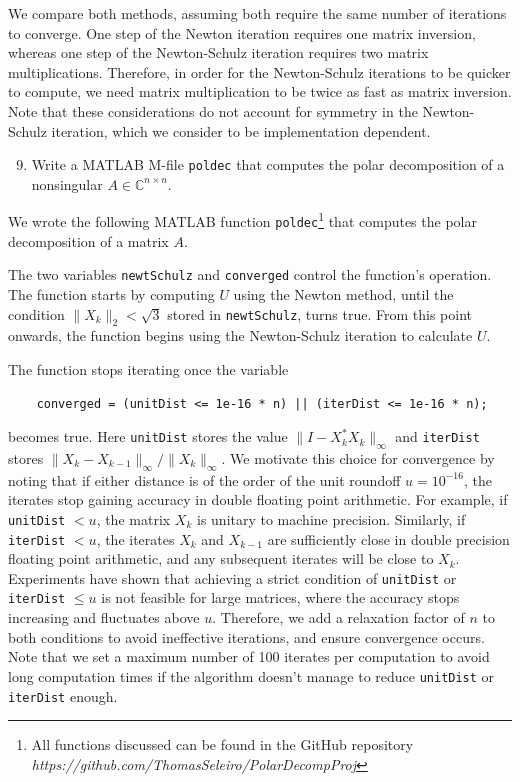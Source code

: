 \documentclass[10pt, A4paper]{article}
\newcommand{\nxn}{n \times n}
\begin{document}
We compare both methods, assuming both require the same number of 
iterations to converge. 
One step of the Newton iteration requires one matrix inversion, whereas 
one step of the Newton-Schulz iteration requires two matrix 
multiplications.
Therefore, in order for the Newton-Schulz iterations to be quicker to 
compute, we need matrix multiplication to be twice as fast as matrix 
inversion.
Note that these considerations do not account for symmetry in the 
Newton-Schulz iteration, which we consider to be implementation 
dependent. 





\vspace{0.2cm}
\begin{enumerate}
	\setcounter{enumi}{8}
	\item Write a MATLAB M-file \texttt{poldec} that computes the 
	polar decomposition of a nonsingular $A \in \mathbb{C}^{\nxn}$.
\end{enumerate}

We wrote the following MATLAB function \texttt{poldec}\footnote{
All functions discussed can be found in the GitHub repository
\emph{https://github.com/ThomasSeleiro/PolarDecompProj}}
that computes the polar decomposition of a matrix $A$.

{\small
{}
}

The two variables \texttt{newtSchulz} and \texttt{converged} control 
the function's operation.
The function starts by computing $U$ using the Newton method, until
the condition $\|X_k\|_2 < \sqrt{3}$ stored in \texttt{newtSchulz},
turns true. 
From this point onwards, the function begins using the {Newton-Schulz} 
iteration to calculate $U$.

The function stops iterating once the variable
\begin{verbatim}
	converged = (unitDist <= 1e-16 * n) || (iterDist <= 1e-16 * n);
\end{verbatim}
becomes true.
Here \texttt{unitDist} stores the value $\|I -X_k^*X_k\|_\infty$ and 
\texttt{iterDist} stores $\|X_k - X_{k-1} \|_\infty / \|X_k\|_\infty$.
We motivate this choice for convergence by noting that if either 
distance is of the order of the unit roundoff $u = 10^{-16}$, the 
iterates stop gaining accuracy in double floating point arithmetic.
For example, if \texttt{unitDist} $< u$, the matrix $X_k$ is unitary to 
machine precision.
Similarly, if \texttt{iterDist} $< u$, the iterates 
$X_k$ and $X_{k-1}$ are sufficiently close in double precision floating 
point arithmetic, and any subsequent iterates will be close to $X_k$.
Experiments have shown that achieving a strict condition of 
\texttt{unitDist} or \texttt{iterDist} $ \leq u$ is not feasible for 
large matrices, where the accuracy stops increasing and fluctuates 
above $u$.
Therefore, we add a relaxation factor of $n$ to both conditions to 
avoid ineffective iterations, and ensure convergence occurs.
Note that we set a maximum number of 100 iterates per computation to 
avoid long computation times if the algorithm doesn't manage to reduce 
\texttt{unitDist} or \texttt{iterDist} enough.
\end{document}
